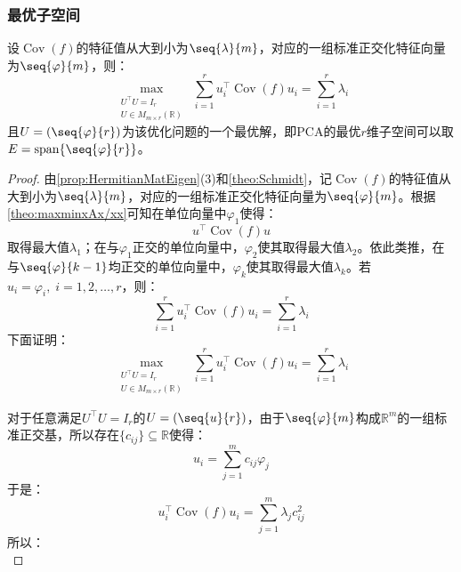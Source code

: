 \subsubsection{最优子空间}
\begin{theorem}\label{theo:PCA}
	设$\operatorname{Cov}(f)$的特征值从大到小为$\seq{\lambda}{m}$，对应的一组标准正交化特征向量为$\seq{\varphi}{m}$，则：
	\begin{equation*}
		\underset{\substack{U^{\top}U=I_r\\U\in M_{m\times r}(\mathbb{R})}}{\max}\;\sum_{i=1}^{r}u_i^{\top}\operatorname{Cov}(f)u_i=\sum_{i=1}^{r}\lambda_i
	\end{equation*}
	且$U=(\seq{\varphi}{r})$为该优化问题的一个最优解，即PCA的最优$r$维子空间可以取$E=\operatorname{span}\{\seq{\varphi}{r}\}$。
\end{theorem}
\begin{proof}
	由\cref{prop:HermitianMatEigen}(3)和\cref{theo:Schmidt}，记$\operatorname{Cov}(f)$的特征值从大到小为$\seq{\lambda}{m}$，对应的一组标准正交化特征向量为$\seq{\varphi}{m}$。根据\cref{theo:maxminxAx/xx}可知在单位向量中$\varphi_1$使得：
	\begin{equation*}
		u^{\top}\operatorname{Cov}(f)u
	\end{equation*}
	取得最大值$\lambda_1$；在与$\varphi_1$正交的单位向量中，$\varphi_2$使其取得最大值$\lambda_2$。依此类推，在与$\seq{\varphi}{k-1}$均正交的单位向量中，$\varphi_k$使其取得最大值$\lambda_k$。若$u_i=\varphi_i,\;i=1,2,\dots,r$，则：
	\begin{equation*}
		\sum_{i=1}^{r}u_i^{\top}\operatorname{Cov}(f)u_i=\sum_{i=1}^{r}\lambda_i
	\end{equation*}
	下面证明：
	\begin{equation*}
		\underset{\substack{U^{\top}U=I_r\\U\in M_{m\times r}(\mathbb{R})}}{\max}\;\sum_{i=1}^{r}u_i^{\top}\operatorname{Cov}(f)u_i=\sum_{i=1}^{r}\lambda_i
	\end{equation*}\par
	对于任意满足$U^{\top}U=I_r$的$U=(\seq{u}{r})$，由于$\seq{\varphi}{m}$构成$\mathbb{R}^m$的一组标准正交基，所以存在$\{c_{ij}\}\subseteq\mathbb{R}$使得：
	\begin{equation*}
		u_i=\sum_{j=1}^{m}c_{ij}\varphi_j
	\end{equation*}
	于是：
	\begin{equation*}
		u_i^{\top}\operatorname{Cov}(f)u_i=\sum_{j=1}^{m}\lambda_jc_{ij}^2
	\end{equation*}
	所以：
	\begin{equation*}

\end{equation*}
\end{proof}
